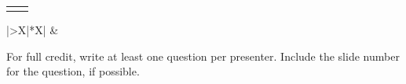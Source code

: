 \vspace{8.5bp}
{\renewcommand{\arraystretch}{0}%
\noindent\begin{tabularx}{\textwidth}{|X|X|}
  \hline
  \wsvcell{\qsrowht}{} & \\
  \hline
  \wsvcell{\qsrowht}{} & \\
  \hline
\end{tabularx}\par}

\vspace{8.9bp}
{\small\renewcommand{\arraystretch}{0}\setlength{\wssectionrowht}{\qsrowht}%
\noindent\begin{tabularx}{\textwidth}{|>{\bfseries}X|*{\wssectioncount}{X|}}
  \hline
   & \wssections \\
  \hline
\end{tabularx}\par}

\vspace{11.1bp}
{\fontsize{14}{16bp}\selectfont\itshape\raggedright For full credit, write at least one question per presenter. Include the slide number for the question, if possible.\par}

\qspresenter
\qspresenter

\newpage

\vspace*{-8.8bp}\nointerlineskip
\qspresenter
\qspresenter
\qspresenter


